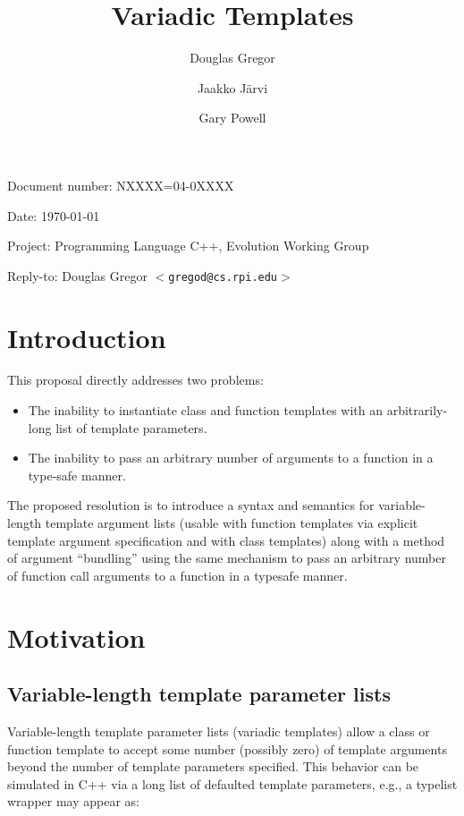 \documentclass{article}
\begin{document}
\pagestyle{myheadings}

\title{Variadic Templates}
\author{Douglas Gregor \and Jaakko J\"arvi \and Gary Powell}
\date{}
\maketitle

\par\noindent Document number: NXXXX=04-0XXXX
\par\noindent Date: \today
\par\noindent Project: Programming Language C++, Evolution Working Group
\par\noindent Reply-to: Douglas Gregor $<${\tt gregod@cs.rpi.edu}$>$

\section{Introduction}
This proposal directly addresses two problems:
\begin{itemize}
\item The inability to instantiate class and function templates with an arbitrarily-long list of template parameters.
\item The inability to pass an arbitrary number of arguments to a function in a type-safe manner.
\end{itemize}

The proposed resolution is to introduce a syntax and semantics for
variable-length template argument lists (usable with function templates
via explicit template argument specification and with class templates)
along with a method of argument ``bundling'' using the same mechanism to
pass an arbitrary number of function call arguments to a function in a
typesafe manner.

\section{Motivation}
\subsection{Variable-length template parameter lists}
Variable-length template parameter lists (variadic templates) allow a
class or function template to accept some number (possibly zero) of
template arguments beyond the number of template parameters specified.
This behavior can be simulated in C++ via a long list of defaulted
template parameters, e.g., a typelist wrapper may appear as:
\end{document}
